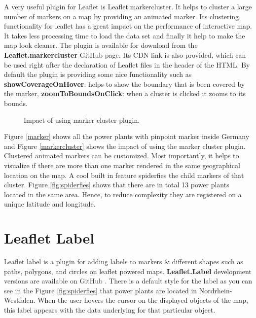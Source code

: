 A very useful plugin for Leaflet is Leaflet.markercluster. It helps to cluster a large number of markers on a map by providing an animated marker. Its clustering functionality for leaflet has a great impact on the performance of interactive map. It takes less processing time to load the data set and finally it help to make the map look cleaner. The plugin is available for download from the \textbf{Leaflet.markercluster} GitHub page. Its CDN link is also provided, which can be used right after the declaration of Leaflet files in the header of the HTML. By default the plugin is providing some nice functionality such as \textbf{showCoverageOnHover}: helps to show the boundary that is been covered by the marker, \textbf{zoomToBoundsOnClick}: when a cluster is clicked it zooms to its bounds.

\begin{figure}[H]
  \begin{center}
\hfill
{}
\hfill
\caption{Impact of using marker cluster plugin.}
\end{center}
\end{figure}

Figure \ref{marker} shows all the power plants with pinpoint marker inside Germany and Figure \ref{markercluster} shows the impact of using the marker cluster plugin. Clustered animated markers can be customized. Most importantly, it helps to visualize if there are more than one marker rendered in the same geographical location on the map. A cool built in feature spiderfies the child markers of that cluster. Figure \ref{fig:spiderfies} shows that there are in total 13 power plants located in the same area. Hence, to reduce complexity they are registered on a unique latitude and longitude.

\section*{Leaflet Label}

Leaflet label is a plugin for adding labels to markers \& different shapes such as paths, polygons, and circles on leaflet powered maps. \textbf{Leaflet.Label}  development versions are available on GitHub . There is a default style for the label as you can see in the Figure \ref{fig:spiderfies} that power plants are located in Nordrhein-Westfalen. When the user hovers the cursor on the displayed objects of the map, this label appears with the data underlying for that particular object.

